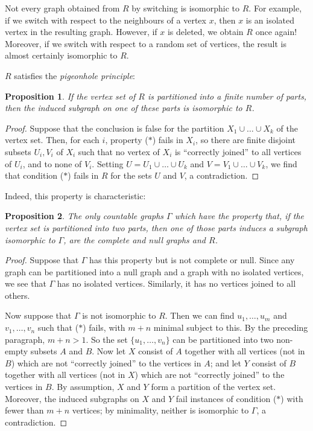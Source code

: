 \documentclass[12pt]{article}
\newtheorem{proposition}{Proposition}
\begin{document}
Not every graph obtained from $R$ by switching is isomorphic to $R$.
For example, if we switch with respect to the neighbours of a vertex
$x$, then $x$ is an isolated vertex in the resulting graph. However,
if $x$ is deleted, we obtain $R$ once again! Moreover, if we switch
with respect to a random set of vertices, the result is almost
certainly isomorphic to $R$.

$R$ satisfies the \emph{pigeonhole principle}:
\begin{proposition}\label{ch32:prop3.3} 
If the vertex set of $R$ is partitioned into a
finite number of parts, then the induced subgraph on one of these
parts is isomorphic to $R$.
\end{proposition}
\begin{proof}
Suppose that the conclusion is false for the
partition $X_1 \cup \ldots \cup X_k$ of the vertex set. Then, for
each $i$, property ($\ast$) fails in $X_i$, so there are finite
disjoint subsets $U_i, V_i$ of $X_i$ such that no vertex of $X_i$
is ``correctly joined'' to all vertices of $U_i$, and to none of
$V_i$. Setting $U = U_1 \cup \ldots \cup U_k$ and $V = V_1 \cup
\ldots \cup V_k$, we find that condition ($\ast$) fails in $R$ for
the sets $U$ and $V$, a contradiction.
\end{proof}

Indeed, this property is characteristic:
\begin{proposition}\label{ch32:prop3.4} 
The only countable graphs $\Gamma$ which have
the property that, if the vertex set is partitioned into two parts,
then one of those parts induces a subgraph isomorphic to $\Gamma$,
are the complete and null graphs and $R$.
\end{proposition}
\begin{proof}
Suppose that $\Gamma$ has this property but is not
complete or null. Since any graph can be partitioned into a null
graph and a graph with no isolated vertices, we see that $\Gamma$
has no isolated vertices. Similarly, it has no vertices joined to
all others.

Now suppose that $\Gamma$ is not isomorphic to $R$. Then we can find
$u_1,\ldots,u_m$ and $v_1,\ldots,v_n$ such that ($\ast$) fails, with
$m +n$ minimal subject to this. By the preceding paragraph, $m + n >
1$. So the set $\{u_1,\ldots, v_n\}$ can be partitioned into two
non-empty subsets $A$ and $B$. Now let $X$ consist of $A$ together
with all vertices (not in $B$) which are not ``correctly joined'' to
the vertices in $A$; and let $Y$ consist of $B$ together with all
vertices (not in $X$) which are not ``correctly joined'' to the
vertices in $B$. By assumption, $X$ and $Y$ form a partition of the
vertex set. Moreover, the induced subgraphs on $X$ and $Y$ fail
instances of condition ($\ast$) with fewer than $m +n$ vertices; by
minimality, neither is isomorphic to $\Gamma$, a contradiction.
\end{proof}
\end{document}
